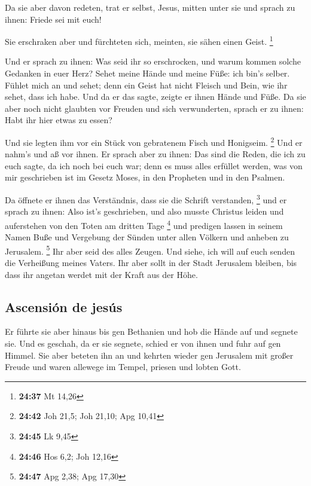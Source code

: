  Da sie aber davon redeten, trat er selbst, Jesus, mitten
unter sie und sprach zu ihnen: Friede sei mit euch!

 Sie erschraken aber und fürchteten sich, meinten, sie
sähen einen Geist. \footnote{\textbf{24:37} Mt 14,26}

 Und er sprach zu ihnen: Was seid ihr so erschrocken, und
warum kommen solche Gedanken in euer Herz?  Sehet meine
Hände und meine Füße: ich bin's selber. Fühlet mich an und sehet; denn
ein Geist hat nicht Fleisch und Bein, wie ihr sehet, dass ich habe.
 Und da er das sagte, zeigte er ihnen Hände und Füße.
 Da sie aber noch nicht glaubten vor Freuden und sich
verwunderten, sprach er zu ihnen: Habt ihr hier etwas zu essen?

 Und sie legten ihm vor ein Stück von gebratenem Fisch
und Honigseim. \footnote{\textbf{24:42} Joh 21,5; Joh 21,10; Apg 10,41}
 Und er nahm's und aß vor ihnen.  Er
sprach aber zu ihnen: Das sind die Reden, die ich zu euch sagte, da ich
noch bei euch war; denn es muss alles erfüllet werden, was von mir
geschrieben ist im Gesetz Moses, in den Propheten und in den Psalmen.

 Da öffnete er ihnen das Verständnis, dass sie die
Schrift verstanden, \footnote{\textbf{24:45} Lk 9,45} 
und er sprach zu ihnen: Also ist's geschrieben, und also musste Christus
leiden und auferstehen von den Toten am dritten Tage \footnote{\textbf{24:46}
  Hos 6,2; Joh 12,16}  und predigen lassen in seinem
Namen Buße und Vergebung der Sünden unter allen Völkern und anheben zu
Jerusalem. \footnote{\textbf{24:47} Apg 2,38; Apg 17,30} 
Ihr aber seid des alles Zeugen.  Und siehe, ich will auf
euch senden die Verheißung meines Vaters. Ihr aber sollt in der Stadt
Jerusalem bleiben, bis dass ihr angetan werdet mit der Kraft aus der
Höhe.

\hypertarget{ascensiuxf3n-de-jesuxfas}{%
\subsection{Ascensión de jesús}\label{ascensiuxf3n-de-jesuxfas}}

 Er führte sie aber hinaus bis gen Bethanien und hob die
Hände auf und segnete sie.  Und es geschah, da er sie
segnete, schied er von ihnen und fuhr auf gen Himmel. 
Sie aber beteten ihn an und kehrten wieder gen Jerusalem mit großer
Freude  und waren allewege im Tempel, priesen und lobten
Gott.

